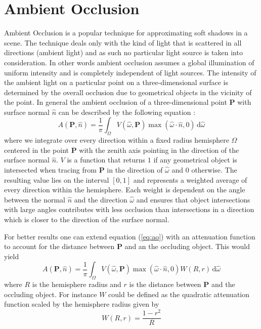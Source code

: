 \section{Ambient Occlusion}

Ambient Occlusion is a popular technique for approximating soft
shadows in a scene. The technique deals only with the kind of light
that is scattered in all directions (ambient light) and as such no
particular light source is taken into consideration. In other words
ambient occlusion assumes a global illumination of uniform intensity
and is completely independent of light sources.
The intensity of the ambient light on a particular point on a
three-dimensional surface is determined by the overall occlusion due
to geometrical objects in the vicinity of the point. In general the
ambient occlusion of a three-dimensional point $\mathbf{P}$ with
surface normal $\hat{n}$ can be described by the following equation
\citep{shanmugam}:
\begin{equation}
  \label{eq:ao}
  A(\mathbf{P},\hat{n}) = \frac{1}{\pi} \int_\Omega V(\hat{\omega},\mathbf{P})\max(\hat{\omega}\cdot\hat{n},0)\,\mathrm{d}\hat{\omega}
\end{equation}
where we integrate over every direction within a fixed radius
hemisphere $\Omega$ centered in the point $\mathbf{P}$ with the zenith
axis pointing in the direction of the surface normal $\hat{n}$. $V$ is
a function that returns $1$ if any geometrical object is intersected
when tracing from $\mathbf{P}$ in the direction of $\hat{\omega}$ and
$0$ otherwise. The resulting value lies on the interval $[0,1]$ and
represents a weighted average of every direction within the
hemisphere. Each weight is dependent on the angle between the normal
$\hat{n}$ and the direction $\hat{\omega}$ and ensures that object
intersections with large angles contributes with less occlusion than
intersections in a direction which is closer to the direction of the
surface normal.

For better results one can extend equation (\ref{eq:ao}) with an
attenuation function to account for the distance between $\mathbf{P}$
and an the occluding object. This would yield
\begin{equation}
  \label{eq:ao_att}
  A(\mathbf{P},\hat{n}) = \frac{1}{\pi} \int_\Omega
  V(\hat{\omega},\mathbf{P})\max(\hat{\omega}\cdot\hat{n},0)W(R,r) \,\mathrm{d}\hat{\omega}
\end{equation}
where $R$ is the hemisphere radius and $r$ is the distance between
$\mathbf{P}$ and the occluding object. For instance $W$ could be
defined as the quadratic attenuation function scaled by the hemisphere
radius given by
\begin{equation}
  \label{eq:quad_att}
  W(R,r) = \frac{1-r^2}{R}
\end{equation}

